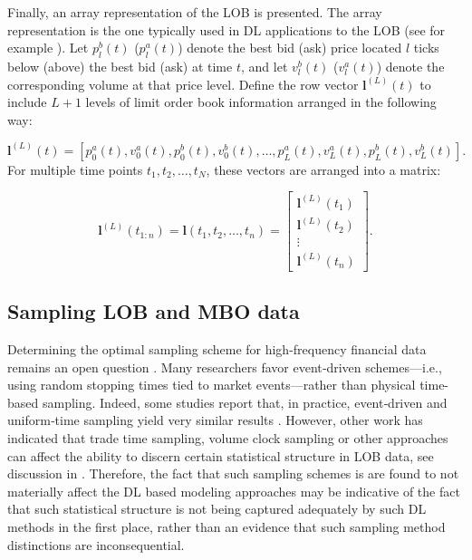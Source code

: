\documentclass[10pt,a4paper,oneside]{article}
\providecommand{\DIFaddtex}[1]{{\protect\color{blue} \sf #1}} %
\providecommand{\DIFdeltex}[1]{{\protect\color{red} \scriptsize #1}} %
\providecommand{\DIFaddbegin}{} %
\providecommand{\DIFaddend}{} %
\providecommand{\DIFdelbegin}{} %
\providecommand{\DIFdelend}{} %
\providecommand{\DIFadd}[1]{\texorpdfstring{\DIFaddtex{#1}}{#1}} %
\providecommand{\DIFdel}[1]{\texorpdfstring{\DIFdeltex{#1}}{}} %
\newcommand{\DIFscaledelfig}{0.5}
\newlength{\DIFdelgraphicswidth} %
\newlength{\DIFdelgraphicsheight} %
\newcommand{\DIFaddincludegraphics}[2][]{{\color{blue}\fbox{\DIFOincludegraphics[#1]{#2}}}} %
\newcommand{\DIFdelincludegraphics}[2][]{%
\sbox{\DIFdelgraphicsbox}{\DIFOincludegraphics[#1]{#2}}%
\settoboxwidth{\DIFdelgraphicswidth}{\DIFdelgraphicsbox} %
\settoboxtotalheight{\DIFdelgraphicsheight}{\DIFdelgraphicsbox} %
\scalebox{\DIFscaledelfig}{%
\parbox[b]{\DIFdelgraphicswidth}{\usebox{\DIFdelgraphicsbox}\\[-\baselineskip] \rule{\DIFdelgraphicswidth}{0em}}\llap{\resizebox{\DIFdelgraphicswidth}{\DIFdelgraphicsheight}{%
\setlength{\unitlength}{\DIFdelgraphicswidth}%
\begin{picture}(1,1)%
\thicklines\linethickness{2pt} %
{\color[rgb]{1,0,0}\put(0,0){\framebox(1,1){}}}%
{\color[rgb]{1,0,0}\put(0,0){\line( 1,1){1}}}%
{\color[rgb]{1,0,0}\put(0,1){\line(1,-1){1}}}%
\end{picture}%
}\hspace*{3pt}}} %
} %
\DeclareRobustCommand{\DIFaddbegin}{\DIFOaddbegin \let\includegraphics\DIFaddincludegraphics} %
\DeclareRobustCommand{\DIFaddend}{\DIFOaddend \let\includegraphics\DIFOincludegraphics} %
\DeclareRobustCommand{\DIFdelbegin}{\DIFOdelbegin \let\includegraphics\DIFdelincludegraphics} %
\DeclareRobustCommand{\DIFdelend}{\DIFOaddend \let\includegraphics\DIFOincludegraphics} %
\begin{document}
Finally, an array representation of the LOB is presented. The array representation is the one typically used in DL applications to the LOB (see for example \cite{kolm2024improving, Zhang_2019}). Let $p_l^b(t)$ ($p_l^a(t)$) denote the best bid (ask) price located $l$ ticks below (above) the best bid (ask) at time $t$, and let $v_l^b(t)$ ($v_l^a(t)$) denote the corresponding volume at that price level. Define the row vector $\mathbf{l}^{(L)}(t)$ to include $L + 1$ levels of limit order book information arranged in the following way:

$$
    \mathbf{l}^{(L)}(t) = [p^a_0(t), v^a_0(t), p^b_0(t), v^b_0(t), \dots, p^a_L(t), v^a_L(t), p^b_L(t), v^b_L(t)].
$$
For multiple time points $t_1, t_2, \dots, t_N$, these vectors are arranged into a matrix:

$$
    \mathbf{l}^{(L)}(t_{1:n})=\mathbf{l}(t_1, t_2, \dots, t_n) = \begin{bmatrix}
        \mathbf{l}^{(L)}(t_1) \\
        \mathbf{l}^{(L)}(t_2) \\
        \vdots                \\
        \mathbf{l}^{(L)}(t_n)
    \end{bmatrix}.
$$

\subsection{Sampling LOB and MBO data}
\label{SubSect:SampLOB}
Determining the optimal sampling scheme for high-frequency financial data remains an open question \cite{dutta2023review}.  Many researchers favor event‐driven schemes—i.e., using random stopping times tied to market events—rather than physical time-based sampling.  Indeed, some studies report that, in practice, event‐driven and uniform‐time sampling yield very similar results \cite{easley2021microstructure}. However, other work has indicated that trade time sampling, volume clock sampling or other approaches can affect the ability to discern certain statistical structure in LOB data, see discussion in \cite{koukorinis4959155memory}. Therefore, the fact that such sampling schemes \DIFdelbegin \DIFdel{is }\DIFdelend \DIFaddbegin \DIFadd{are }\DIFaddend found to not materially affect the DL based modeling approaches may be indicative of the fact that such statistical structure is not being captured adequately by such DL methods in the first place, rather than \DIFdelbegin \DIFdel{an }\DIFdelend evidence that such sampling method distinctions are inconsequential.
\end{document}
